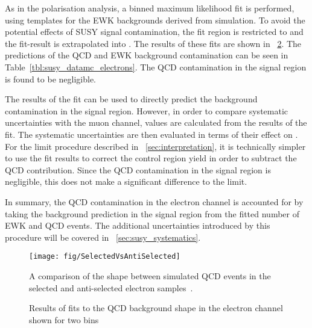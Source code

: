 As in the \PW polarisation analysis, a binned maximum likelihood fit is
performed, using templates for the \ac{EWK} backgrounds derived from
simulation. To avoid the potential effects of \ac{SUSY} signal contamination,
the fit region is restricted to \LPcontrol and the fit-result is extrapolated
into \LPsignal. The results of these fits are shown in
\fig~\ref{fig:susy_elqcd}. The predictions of the \ac{QCD} and \ac{EWK}
background contamination can be seen in
Table~\ref{tbl:susy_datamc_electrons}. The \ac{QCD} contamination in the signal
region is found to be negligible.

The results of the fit can be used to directly predict the background
contamination in the signal region. However, in order to compare systematic
uncertainties with the muon channel, \RCS values are calculated from the results
of the fit. The systematic uncertainties are then evaluated in terms of their
effect on \RCS. For the limit procedure described in
\chap~\ref{sec:interpretation}, it is technically simpler to use the fit results
to correct the control region yield in order to subtract the \ac{QCD}
contribution. Since the \ac{QCD} contamination in the signal region is
negligible, this does not make a significant difference to the limit.

In summary, the \ac{QCD} contamination in the electron channel is accounted for
by taking the background prediction in the signal region from the fitted number
of \ac{EWK} and \ac{QCD} events. The additional uncertainties introduced by this
procedure will be covered in \sec~\ref{sec:susy_systematics}.

\begin{figure}
\centering
\texttt{[image: fig/SelectedVsAntiSelected]}
\caption[\acs{MC} \LP shape comparison between selected and anti-selected
\acs{QCD} events]{A comparison of the \LP shape between simulated \ac{QCD} events
  in the selected and anti-selected electron samples~\cite{susy_ra4_an}.}
\label{fig:susy_elqcd_selasel}
\end{figure}


\begin{figure}
\centering
{}\quad
{}
\caption[Results of fits to the \acs{QCD} background shape in the electron
channel]{Results of fits to the \ac{QCD} background shape in the electron
  channel shown for two \STlep bins~\cite{susy_ra4_pas}}
\label{fig:susy_elqcd}
\end{figure}

